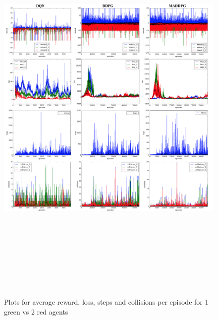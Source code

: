 \begin{figure}[htbp]
    \vspace*{-4cm}
    \hspace*{-3.5cm}
    \includegraphics[width=21cm, height=20cm]{2vs1}
	\caption{Plots for average reward, loss, steps and collisions per episode for 1 green vs 2 red agents}\label{Figure 4}
\end{figure}

